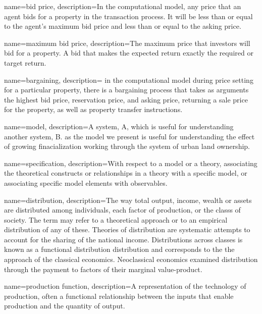 {
name=bid price,
description={In the computational model, any price that an agent bids for a property in the transaction process. It will be less than or equal to the agent's maximum bid price and less than or equal to the asking price.}
}

{
name=maximum bid price,
description={The maximum price that investors will bid for a property. A bid that makes the expected return exactly the required or  target return.}
}

{
name=bargaining,
description= {in the computational model during price setting for a particular property, there is a bargaining process that takes as arguments the highest bid price, reservation price, and asking price, returning a sale price for the property, as well as property transfer instructions.}
}


{
name=model,
description={A system, A, which is useful for understanding another system, B. as the model we present is useful for understanding the effect of growing finacialization working through the system of urban land ownership.}
}

{
name=specification,
description={With respect to a model or a theory, associating the theoretical constructs or relationships in a theory with a specific model, or associating specific model elements with observables.}
}

{
name=distribution,
description={The way total \gls{output}, income, \gls{wealth} or assets are distributed among individuals, each \gls{factor of production}, or the \glspl{class} of society. The term may refer to a theoretical approach  or to an empirical distribution of any of these. Theories of distribution are systematic attempts to account for the sharing of the national income.  Distributions across classes is known as a functional distribution distribution and  corresponds to the the approach of the \gls{classical economics}. Neoclassical economics examined distribution through the payment to factors of their \gls{marginal value-product}.}
}

{
name=production function,
description={A representation of the technology of production, often a functional relationship between the \glspl{input} that enable production and the quantity of \gls{output}.}
}

